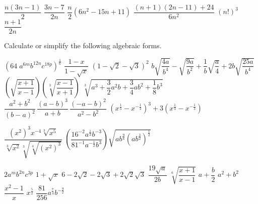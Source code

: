 \begin{Answer}\phantom{}
    \begin{multicols}{2}
		
			\Question $\dfrac{n(3n-1)}{2}$
			\Question $\dfrac{3n-7}{2n}$
			\Question $\dfrac{n}{2}(6n^2-15n+11)$	
			\Question $\dfrac{(n+1)(2n-11)+24}{6n^2}$
            \Question $\left(n!\right)^3$ 
		    \Question $\dfrac{n+1}{2n}$ 
		\EndCurrentQuestion
	\end{multicols}
\end{Answer}

\ifanalysis\pagebreak\fi

\begin{Exercise} Calculate or simplify the following algebraic forms.
    \begin{multicols}{2}
    	\Question[difficulty = 1] $\left(64\;a^{6m}b^{12n}c^{18p}\right)^{\frac{1}{6}}$
    	\Question[difficulty = 1] $\dfrac{1-x}{1-\sqrt{x}}$
    	\Question[difficulty = 1] $\left(1-\sqrt{2}-\sqrt{3}\right)^2$
    	\Question[difficulty = 1] $b\sqrt{\dfrac{4a}{b^4}}-\sqrt{\dfrac{9a}{b^2}}+\dfrac{1}{b}\sqrt{\dfrac{a}{4}}+2b\sqrt{\dfrac{25a}{b^4}}$
    	\ifanalysis\Question[difficulty = 1]\fi \ifcalculus\Question[difficulty = 2]\fi $\left(\sqrt{\dfrac{x+1}{x-1}}\right) \left( \sqrt[3]{\dfrac{x-1}{x+1}}\right)$
    	\ifanalysis\Question[difficulty = 1]\fi \ifcalculus\Question[difficulty = 2]\fi $\sqrt[3]{a^3+\dfrac{3}{2}a^2b+\dfrac{3}{4}ab^2+\dfrac{1}{8}b^3}$
    	\ifanalysis\Question[difficulty = 1]\fi \ifcalculus\Question[difficulty = 2]\fi $\dfrac{a^2+b^2}{\left(b-a\right)^2}\,\dfrac{\left(a-b\right)^3}{a+b}\,\dfrac{\left(-a-b\right)^2}{a^2-b^2}$
    	\ifanalysis\Question[difficulty = 1]\fi \ifcalculus\Question[difficulty = 2]\fi $\left(x^{\frac{1}{3}}-x^{-\frac{1}{3}}\right)^3+3\left(x^{\frac{1}{3}}-x^{-\frac{1}{3}}\right)$
    
    	\ifanalysis\Question[difficulty = 1]\fi \ifcalculus\Question[difficulty = 2]\fi $ \dfrac{\left(x^2 \right)^3 x^{-4} \sqrt[3]{x^5}}{\sqrt[3]{x^2} \sqrt[3]{\sqrt[4]{\left(x^2 \right)^3}}} $
    	\Question[difficulty = 2] $\left( \dfrac{16^{-2} a^{\frac{1}{2}}b^{-3}}{81^{-1} a^{-\frac{1}{2}}b^{3}} \right) \sqrt{ab^{\frac{9}{4}} \left( ab^{\frac{3}{2}} \right)^{\frac{1}{2}}}  $
    	\EndCurrentQuestion
	\end{multicols}
\end{Exercise}

\begin{Answer}\phantom{}
    \begin{multicols}{2}
	
		\Question $2 a^m b^{2n} c^{3p}$
		\Question $1+\sqrt{x}$
		\Question $6-2\sqrt{2}-2\sqrt{3}+2\sqrt{2}\sqrt{3}$
		\Question $\dfrac{19\sqrt{a}}{2b}$
		\Question $ \sqrt[6]{\dfrac{x+1}{x-1}}$
		\Question $a + \dfrac{b}{2}$
		\Question $a^2+b^2$
		\Question $\dfrac{x^2-1}{x}$
		\Question $x^{\frac{5}{2}} $ 
		\Question $\dfrac{81}{256} a^{\frac{7}{4}} b^{-\frac{9}{2}}$ 
	\EndCurrentQuestion
	\end{multicols}
\end{Answer}

